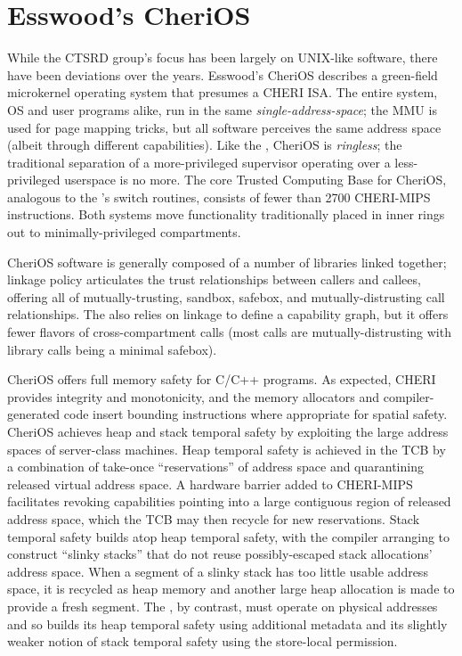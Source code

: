 \section{Esswood's CheriOS}

While the CTSRD group's focus has been largely on UNIX-like software, there have been deviations over the years.
Esswood's CheriOS \cite{esswood:cherios} describes a green-field microkernel operating system that presumes a CHERI ISA.
The entire system, OS and user programs alike, run in the same \emph{single-address-space}; the MMU is used for page mapping tricks, but all software perceives the same address space (albeit through different capabilities).
Like the \cherimcuos{}, CheriOS is \emph{ringless}; the traditional separation of a more-privileged supervisor operating over a less-privileged userspace is no more.
The core Trusted Computing Base for CheriOS, analogous to the \cherimcuos{}'s switch routines, consists of fewer than 2700 CHERI-MIPS instructions.
Both systems move functionality traditionally placed in inner rings out to minimally-privileged compartments.

CheriOS software is generally composed of a number of libraries linked together; linkage policy articulates the trust relationships between callers and callees, offering all of mutually-trusting, sandbox, safebox, and mutually-distrusting call relationships.
%
The \cherimcuos{} also relies on linkage to define a capability graph, but it offers fewer flavors of cross-compartment calls (most calls are mutually-distrusting with library calls being a minimal safebox).

CheriOS offers full memory safety for C/C++ programs.
As expected, CHERI provides integrity and monotonicity, and the memory allocators and compiler-generated code insert bounding instructions where appropriate for spatial safety.
CheriOS achieves heap and stack temporal safety by exploiting the large address spaces of server-class machines.
Heap temporal safety is achieved in the TCB by a combination of take-once ``reservations'' of address space and quarantining released virtual address space.
A hardware barrier added to CHERI-MIPS facilitates revoking capabilities pointing into a large contiguous region of released address space, which the TCB may then recycle for new reservations.
Stack temporal safety builds atop heap temporal safety, with the compiler arranging to construct ``slinky stacks'' \cite[\S 4.1]{esswood:cherios} that do not reuse possibly-escaped stack allocations' address space.
When a segment of a slinky stack has too little usable address space, it is recycled as heap memory and another large heap allocation is made to provide a fresh segment.
The \cherimcuos{}, by contrast, must operate on physical addresses and so builds its heap temporal safety using additional \cherimcuisa{} metadata and its slightly weaker notion of stack temporal safety using the store-local permission.

